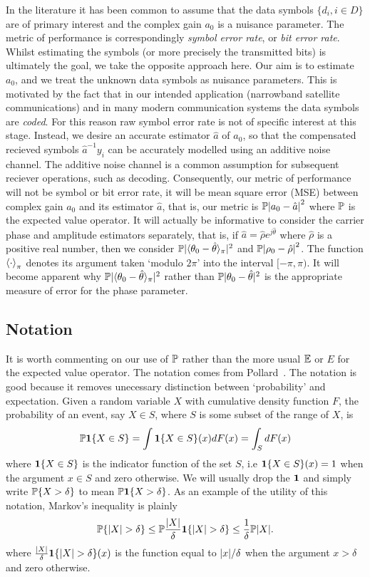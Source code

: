 \documentclass[journal]{IEEEtran}
\begin{document}
In the literature it has been common to assume that the data symbols $\{d_i, i \in D\}$ are of primary interest and the complex gain $a_0$ is a nuisance parameter.  The metric of performance is correspondingly \emph{symbol error rate}, or \emph{bit error rate}.  Whilst estimating the symbols (or more precisely the transmitted bits) is ultimately the goal, we take the opposite approach here.  Our aim is to estimate $a_0$, and we treat the unknown data symbols as nuisance parameters.  This is motivated by the fact that in our intended application (narrowband satellite communications) and in many modern communication systems the data symbols are \emph{coded}.  For this reason raw symbol error rate is not of specific interest at this stage.  Instead, we desire an accurate estimator $\hat{a}$ of $a_0$, so that the compensated recieved symbols $\hat{a}^{-1}y_i$ can be accurately modelled using an additive noise channel.  The additive noise channel is a common assumption for subsequent reciever operations, such as decoding.  Consequently, our metric of performance will not be symbol or bit error rate, it will be mean square error (MSE) between complex gain $a_0$ and its estimator $\hat{a}$, that is, our metric is ${\mathbb P}{\left| a_0 - \hat{a} \right|}^2$ where ${\mathbb P}$ is the expected value operator. It will actually be informative to consider the carrier phase and amplitude estimators separately, that is, if $\hat{a} = \hat{\rho}e^{j\hat{\theta}}$ where $\hat{\rho}$ is a positive real number, then we consider ${\mathbb P}\vert\langle\theta_0 - \hat{\theta}\rangle_\pi\vert^2$ and ${\mathbb P}{\left| \rho_0 - \hat{\rho} \right|}^2$.  The function $\left\langle \cdot \right\rangle_\pi$ denotes its argument taken `modulo $2\pi$' into the interval $[-\pi, \pi)$.  It will become apparent why ${\mathbb P}\vert\langle\theta_0 - \hat{\theta}\rangle_\pi\vert^2$ rather than ${\mathbb P}\vert\theta_0 - \hat{\theta}\vert^2$ is the appropriate measure of error for the phase parameter.

\subsection{Notation}
It is worth commenting on our use of ${\mathbb P}$ rather than the more usual ${\mathbb E}$ or $E$ for the expected value operator.  The notation comes from Pollard~\cite[Ch 1]{Pollard_users_guide_prob_2002}.  The notation is good because it removes unecessary distinction between `probability' and expectation.  Given a random variable $X$ with cumulative density function $F$, the probability of an event, say $X \in S$, where $S$ is some subset of the range of $X$, is 
\[
{\mathbb P} {\mathbf 1} \{X \in S\} = \int {\mathbf 1} \{X \in S\}(x) dF(x) = \int_{S} dF(x)
\]
where ${\mathbf 1} \{X \in S\}$ is the indicator function of the set $S$, i.e ${\mathbf 1} \{X \in S\}(x) = 1$ when the argument $x \in S$ and zero otherwise.  We will usually drop the $\boldsymbol{1}$ and simply write ${\mathbb P} \{ X > \delta \}$ to mean ${\mathbb P} \boldsymbol{1}\{ X > \delta \}$.  As an example of the utility of this notation, Markov's inequality is plainly 
\[
{\mathbb P} \{ {\left| X \right|} > \delta \}  \leq {\mathbb P} \frac{{\left| X \right|}}{\delta}\boldsymbol{1}\{ {\left| X \right|} > \delta \} \leq \frac{1}{\delta}{\mathbb P}{\left| X \right|}.
\]
where $\frac{{\left| X \right|}}{\delta}\boldsymbol{1}\{ {\left| X \right|} > \delta \}(x)$ is the function equal to ${\left| x \right|}/\delta$ when the argument $x > \delta$ and zero otherwise.
\end{document}
